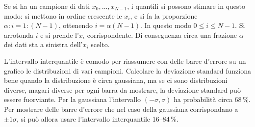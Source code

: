 Se si ha un campione di dati $x_0, \ldots, x_{N-1}$, i quantili si possono
stimare in questo modo: si mettono in ordine crescente le $x_i$, e si fa la
proporzione $\alpha:i = 1:(N-1)$, ottenendo $i = \alpha (N-1)$. In questo modo
$0 \le i \le N-1$. Si arrotonda $i$ e si prende l'$x_i$ corrispondente. Di
conseguenza circa una frazione $\alpha$ dei dati sta a sinistra dell'$x_i$
scelto.

L'intervallo interquantile è comodo per riassumere con delle barre d'errore su
un grafico le distribuzioni di vari campioni. Calcolare la deviazione standard
funziona bene quando la distribuzione è circa gaussiana, ma se ci sono
distribuzioni diverse, magari diverse per ogni barra da mostrare, la deviazione
standard può essere fuorviante. Per la gaussiana l'intervallo
$(-\sigma,\sigma)$ ha probabilità circa 68\,\%. Per mostrare delle barre
d'errore che nel caso della gaussiana corrispondano a $\pm1\sigma$, si può
allora usare l'intervallo interquantile 16--84\,\%.
